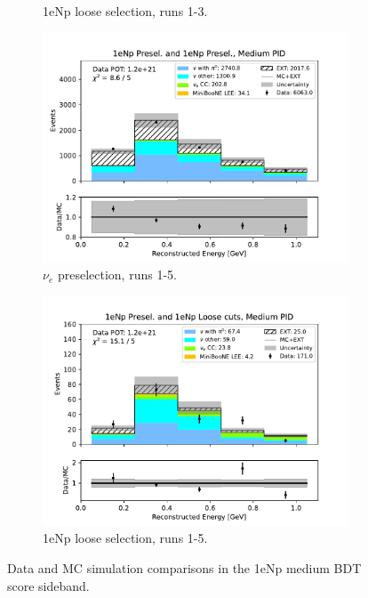 \begin{figure}[H]
\begin{subfigure}{0.5\linewidth}
        \caption{1eNp loose selection, runs 1-3.}
    \end{subfigure}
    \begin{subfigure}{0.5\linewidth}
        \includegraphics[width=\linewidth]{technote/Sidebands/Figures/NearSideband/near_sideband_reco_e_run1234a4b4c4d5_NP_NP_MEDIUM_PID.pdf}
        \caption{$\nu_e$ preselection, runs 1-5.}
    \end{subfigure}%
    \begin{subfigure}{0.5\linewidth}
        \includegraphics[width=\linewidth]{technote/Sidebands/Figures/NearSideband/near_sideband_reco_e_run1234a4b4c4d5_NP_NPL_MEDIUM_PID.pdf}
        \caption{1eNp loose selection, runs 1-5.}
    \end{subfigure}
    \caption{Data and MC simulation comparisons in the 1eNp medium BDT score sideband.}
\end{figure}

